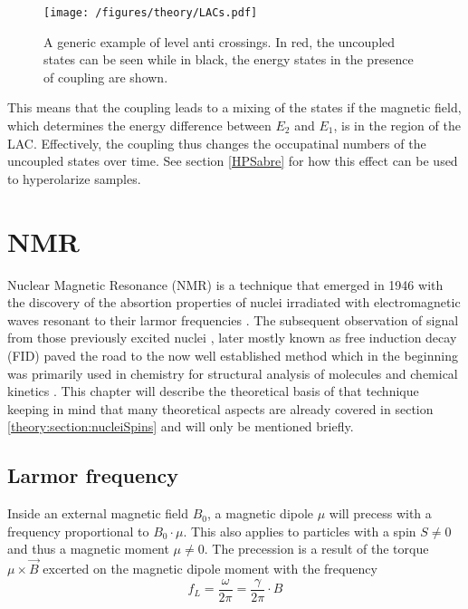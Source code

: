            \begin{figure}
                \centering
                \texttt{[image: /figures/theory/LACs.pdf]}
                \caption[Level anti crossings]{A generic example of level anti crossings. In red, the uncoupled states can be seen while in black, the energy states in the presence of coupling are shown.}
                \label{figure:theory:LAC}
            \end{figure}
            This means that the coupling leads to a mixing of the states if the magnetic field, which determines the energy difference between $E_2$ and $E_1$, is in the region of the LAC. Effectively, the coupling thus changes the occupatinal numbers of the uncoupled states over time. See section \ref{HPSabre} for how this effect can be used to hyperolarize samples.
    \section{NMR}
    Nuclear Magnetic Resonance (NMR) is a technique that emerged in 1946 with the discovery of the absortion properties of nuclei irradiated with electromagnetic waves resonant to their larmor frequencies \cite{ResonanceAbsorption}. The subsequent observation of signal from those previously excited nuclei \cite{rabi_space_1937,purcell_resonance_1946-1,bloch_nuclear_1946}, later mostly known as free induction decay (FID) paved the road to the now well established method which in the beginning was primarily used in chemistry for structural analysis of molecules and chemical kinetics \cite{perrin_application_1990,lipkind_computer-assisted_1988}. This chapter will describe the theoretical basis of that technique keeping in mind that many theoretical aspects are already covered in section \ref{theory:section:nucleiSpins} and will only be mentioned briefly. 
        \subsection{Larmor frequency}
        \label{section:theory:larmorFrequency}
            Inside an external magnetic field $B_0$, a magnetic dipole $\mu$ will precess with a frequency
            proportional to $B_0\cdot \mu$. This also applies to  particles with a spin $S\neq0$ and thus
            a magnetic moment $\mu\neq0$. The precession is a result of the torque $\mu\times\vec B$
            excerted on the magnetic dipole moment with the frequency
            \begin{equation}
                f_L=\frac{\omega}{2\pi} = \frac{\gamma}{2\pi}\cdot B
            \end{equation}
